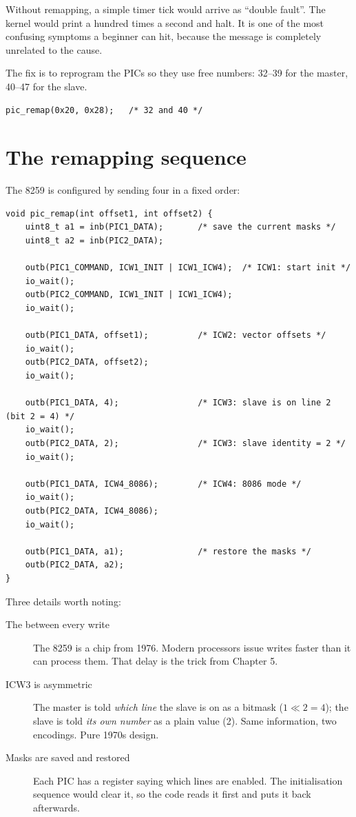 Without remapping, a simple timer tick would arrive as ``double fault''. The kernel would print
 a hundred times a second and halt. It is one of the most confusing symptoms a
beginner can hit, because the message is completely unrelated to the cause.

The fix is to reprogram the PICs so they use free numbers: 32--39 for the master, 40--47 for the
slave.

\begin{lstlisting}[style=c]
pic_remap(0x20, 0x28);   /* 32 and 40 */
\end{lstlisting}

\section{The remapping sequence}

The 8259 is configured by sending four  in a fixed order:

\begin{lstlisting}[style=c]
void pic_remap(int offset1, int offset2) {
    uint8_t a1 = inb(PIC1_DATA);       /* save the current masks */
    uint8_t a2 = inb(PIC2_DATA);

    outb(PIC1_COMMAND, ICW1_INIT | ICW1_ICW4);  /* ICW1: start init */
    io_wait();
    outb(PIC2_COMMAND, ICW1_INIT | ICW1_ICW4);
    io_wait();

    outb(PIC1_DATA, offset1);          /* ICW2: vector offsets */
    io_wait();
    outb(PIC2_DATA, offset2);
    io_wait();

    outb(PIC1_DATA, 4);                /* ICW3: slave is on line 2 (bit 2 = 4) */
    io_wait();
    outb(PIC2_DATA, 2);                /* ICW3: slave identity = 2 */
    io_wait();

    outb(PIC1_DATA, ICW4_8086);        /* ICW4: 8086 mode */
    io_wait();
    outb(PIC2_DATA, ICW4_8086);
    io_wait();

    outb(PIC1_DATA, a1);               /* restore the masks */
    outb(PIC2_DATA, a2);
}
\end{lstlisting}

Three details worth noting:

\begin{description}
  \item[The  between every write] The 8259 is a chip from 1976. Modern processors
    issue writes faster than it can process them. That delay is the trick from Chapter 5.
  \item[ICW3 is asymmetric] The master is told \emph{which line} the slave is on as a bitmask
    ($1 \ll 2 = 4$); the slave is told \emph{its own number} as a plain value (2). Same information,
    two encodings. Pure 1970s design.
  \item[Masks are saved and restored] Each PIC has a register saying which lines are enabled. The
    initialisation sequence would clear it, so the code reads it first and puts it back afterwards.
\end{description}

